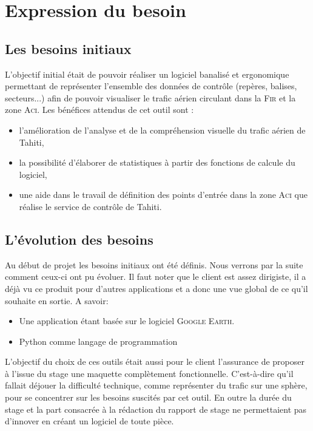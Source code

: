 
\section{Expression du besoin\label{besoins}} 
    \subsection{Les besoins initiaux}
L’objectif initial était de pouvoir réaliser un logiciel banalisé et ergonomique permettant de
représenter l’ensemble des données de contrôle (repères, balises, secteurs...) afin de pouvoir
visualiser le trafic aérien circulant dans la \textsc{Fir} et la zone \textsc{Aci}.
Les bénéfices attendus de cet outil sont :
\begin{itemize}
\item l’amélioration de l’analyse et de la compréhension visuelle du trafic aérien de Tahiti,
\item la possibilité d’élaborer de statistiques à partir des fonctions de calcule du logiciel,
\item une aide dans le travail de définition des points d’entrée dans la zone \textsc{Aci} que réalise le
service de contrôle de Tahiti.
\end{itemize}\medskip

    \subsection{L’évolution des besoins}
Au début de projet les besoins initiaux ont été définis. Nous verrons par la suite comment ceux-ci ont pu évoluer. Il faut noter que le client est assez dirigiste, il a déjà vu ce produit pour d'autres applications et a donc une vue global de ce qu'il souhaite en sortie. A savoir:
\begin{itemize}
    \item Une application étant basée sur le logiciel \textsc{Google Earth}.
    \item Python comme langage de programmation
\end{itemize}\medskip
L’objectif du choix de ces outils était aussi pour le client l’assurance de proposer à l’issue du stage une maquette complètement fonctionnelle. C'est-à-dire qu’il fallait déjouer la difficulté technique, comme représenter du trafic sur une sphère, pour se concentrer sur les besoins suscités par cet outil. En outre la durée du stage et la part consacrée à la rédaction du rapport de stage ne permettaient pas d’innover en créant un logiciel de toute pièce.


